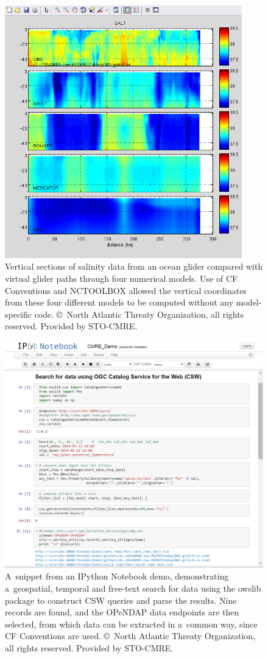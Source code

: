 \documentclass[osd, online, hvmath]{copernicus}
\begin{document}
\begin{figure}
\includegraphics[height=110mm]{os-2015-64-discussions-f04.png}
\caption{Vertical sections of salinity data from an ocean glider
  compared with virtual glider paths through four numerical
  models. Use of CF Conventions and NCTOOLBOX allowed the vertical
  coordinates from these four different models to be computed without
  any model-specific code.  \copyright~North Atlantic Threaty
  Organization, all rights reserved. Provided by STO-CMRE.}
\label{osd-2015-0064-f04.pdf}
\end{figure}

\begin{figure}
\includegraphics[width=125mm]{os-2015-64-discussions-f05.png}
\caption{A~snippet from an IPython Notebook demo, demonstrating
  a~geospatial, temporal and free-text search for data using the
  owslib package to construct CSW queries and parse the results. Nine
  records are found, and the OPeNDAP data endpoints are then selected,
  from which data can be extracted in a~common way, since CF
  Conventions are used. \copyright~North Atlantic Threaty
  Organization, all rights reserved. Provided by STO-CMRE.}
\label{osd-2015-0064-f05.pdf}
\end{figure}
\end{document}
